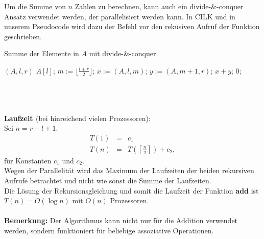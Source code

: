Um die Summe von $n$ Zahlen zu berechnen, kann auch ein divide-\&-conquer Ansatz verwendet werden, der parallelisiert werden kann. In CILK und in unserem Pseudocode wird dazu der Befehl \algspawn vor den rekusiven Aufruf der Funktion geschrieben.
\\
\begin{algorithm}[h]
\caption{Summe der Elemente in $A$ mit divide-\&-conquer.}
\label{AlgSumNZahlenDC}
\begin{algorithmic}
$(A,l,r)$
\RETURN $A[l]$;
\ELSE
{}
\STATE $m:=\lfloor{\frac{l+r}{2}}\rfloor$;
\STATE $x:=$$(A,l,m)$;
\STATE $y:=$$(A,m+1,r)$;
\RETURN $x+y$;
\ELSE
\RETURN $0$;
\ENDIF
\ENDIF
\end{algorithmic}
\end{algorithm}
\\
\\
\\
{\bf{Laufzeit }}(bei hinreichend vielen Prozessoren):\\
Sei $n = r-l+1$.
\begin{eqnarray*}
T(1) & = & c_1 \\
T(n) & = & T\left(\left\lceil\frac{n}{2}\right\rceil\right)+c_2,
\end{eqnarray*} für Konstanten $c_1$ und $c_2$.\\
Wegen der Parallelität wird das Maximum der Laufzeiten der beiden rekursiven Aufrufe betrachtet und nicht wie sonst die Summe der Laufzeiten.\\
Die Lösung der Rekursionsgleichung und somit die Laufzeit der Funktion {\bf{add}} ist $T(n)= O(\log n)$ mit $O(n)$ Prozessoren.
\\
\\
{\bf{Bemerkung:}} Der Algorithmus kann nicht nur für die Addition verwendet werden, sondern funktioniert für beliebige assoziative Operationen.
